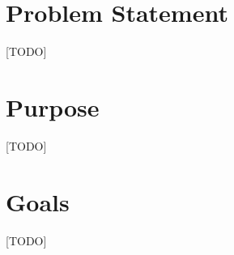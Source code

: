 \section{Problem Statement} \label{ch:introduction:problem}

[TODO]

\section{Purpose}

[TODO]

\section{Goals}
[TODO]

